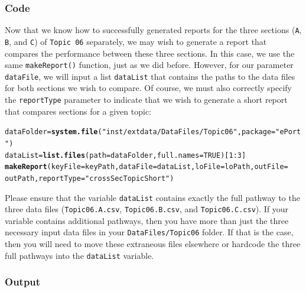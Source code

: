 \documentclass{article}\usepackage[]{graphicx}\usepackage[]{color}
\makeatletter
\newcommand{\hlnum}[1]{\textcolor[rgb]{0.686,0.059,0.569}{#1}}%
\newcommand{\hlstr}[1]{\textcolor[rgb]{0.192,0.494,0.8}{#1}}%
\newcommand{\hlopt}[1]{\textcolor[rgb]{0,0,0}{#1}}%
\newcommand{\hlstd}[1]{\textcolor[rgb]{0.345,0.345,0.345}{#1}}%
\newcommand{\hlkwb}[1]{\textcolor[rgb]{0.69,0.353,0.396}{#1}}%
\newcommand{\hlkwc}[1]{\textcolor[rgb]{0.333,0.667,0.333}{#1}}%
\newcommand{\hlkwd}[1]{\textcolor[rgb]{0.737,0.353,0.396}{\textbf{#1}}}%
\newenvironment{kframe}{%
 \def\at@end@of@kframe{}%
 \ifinner\ifhmode%
  \def\at@end@of@kframe{\end{minipage}}%
  \begin{minipage}{\columnwidth}%
 \fi\fi%
 \def\FrameCommand##1{\hskip\@totalleftmargin \hskip-\fboxsep
 \colorbox{shadecolor}{##1}\hskip-\fboxsep
     \hskip-\linewidth \hskip-\@totalleftmargin \hskip\columnwidth}%
 \MakeFramed {\advance\hsize-\width
   \@totalleftmargin\z@ \linewidth\hsize
   \@setminipage}}%
 {\par\unskip\endMakeFramed%
 \at@end@of@kframe}
\newenvironment{knitrout}{}{} %
\numberwithin{equation}{section} %
\makeatother
\begin{document}
\subsubsection{Code}

Now that we know how to successfully generated reports for the three sections (\texttt{A}, \texttt{B}, and \texttt{C}) of \texttt{Topic 06} separately, we may wish to generate a report that compares the performance between these three sections. In this case, we use the same \texttt{makeReport()} function, just as we did before. However, for our parameter \texttt{dataFile}, we will input a list \texttt{dataList} that contains the paths to the data files for both sections we wish to compare. Of course, we must also correctly specify the \texttt{reportType} parameter to indicate that we wish to generate a short report that compares sections for a given topic:

\begin{knitrout}
\color{fgcolor}\begin{kframe}
\begin{alltt}
\hlstd{dataFolder} \hlkwb{=} \hlkwd{system.file}\hlstd{(}\hlstr{"inst/extdata/DataFiles/Topic06"}\hlstd{,} \hlkwc{package} \hlstd{=} \hlstr{"ePort"}\hlstd{)}
\hlstd{dataList} \hlkwb{=} \hlkwd{list.files}\hlstd{(}\hlkwc{path} \hlstd{= dataFolder,} \hlkwc{full.names} \hlstd{=} \hlnum{TRUE}\hlstd{)[}\hlnum{1}\hlopt{:}\hlnum{3}\hlstd{]}
\hlkwd{makeReport}\hlstd{(}\hlkwc{keyFile} \hlstd{= keyPath,} \hlkwc{dataFile} \hlstd{= dataList,} \hlkwc{loFile} \hlstd{= loPath,} \hlkwc{outFile} \hlstd{=}
  \hlstd{outPath,} \hlkwc{reportType} \hlstd{=} \hlstr{"crossSecTopicShort"}\hlstd{)}
\end{alltt}
\end{kframe}
\end{knitrout}

Please ensure that the variable \texttt{dataList} contains exactly the full pathway to the three data files (\texttt{Topic06.A.csv}, \texttt{Topic06.B.csv}, and \texttt{Topic06.C.csv}). If your variable contains additional pathways, then you have more than just the three necessary input data files in your \texttt{DataFiles/Topic06} folder. If that is the case, then you will need to move these extraneous files elsewhere or hardcode the three full pathways into the \texttt{dataList} variable. 

\subsubsection{Output}
\end{document}
